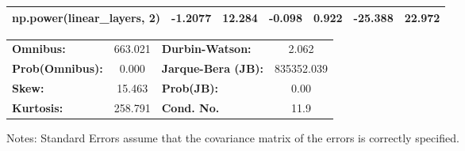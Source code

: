 \begin{center}
\begin{tabular}{lcccccc}
\textbf{np.power(linear\_layers, 2)}      &      -1.2077  &       12.284     &    -0.098  &         0.922        &      -25.388    &       22.972     \\
\bottomrule
\end{tabular}
\begin{tabular}{lclc}
\textbf{Omnibus:}       & 663.021 & \textbf{  Durbin-Watson:     } &     2.062   \\
\textbf{Prob(Omnibus):} &   0.000 & \textbf{  Jarque-Bera (JB):  } & 835352.039  \\
\textbf{Skew:}          &  15.463 & \textbf{  Prob(JB):          } &      0.00   \\
\textbf{Kurtosis:}      & 258.791 & \textbf{  Cond. No.          } &      11.9   \\
\bottomrule
\end{tabular}
\end{center}

Notes: \newline
 [1] Standard Errors assume that the covariance matrix of the errors is correctly specified.